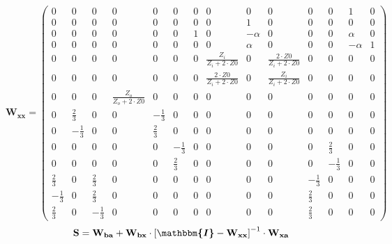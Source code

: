 \[ \mathbf{W_{xx}} = \left(\begin{smallmatrix} 0 & 0 & 0 & 0 & 0 & 0 &
0 & 0 & 0 & 0 & 0 & 0 & 1 & 0 \\ 0 & 0 & 0 & 0 & 0 & 0 & 0 & 0 & 1 & 0
& 0 & 0 & 0 & 0 \\ 0 & 0 & 0 & 0 & 0 & 0 & 1 & 0 & -\alpha & 0 & 0 & 0
& \alpha & 0 \\ 0 & 0 & 0 & 0 & 0 & 0 & 0 & 0 & \alpha & 0 & 0 & 0 &
-\alpha & 1 \\ 0 & 0 & 0 & 0 & 0 & 0 & 0 & \frac{Z_i}{Z_i+2\cdot Z0} &
0 & \frac{2\cdot Z0}{Z_i+2\cdot Z0} & 0 & 0 & 0 & 0 \\ 0 & 0 & 0 & 0 &
0 & 0 & 0 & \frac{2\cdot Z0}{Z_i+2\cdot Z0} & 0 &
\frac{Z_i}{Z_i+2\cdot Z0} & 0 & 0 & 0 & 0 \\ 0 & 0 & 0 &
\frac{Z_o}{Z_o+2\cdot Z0} & 0 & 0 & 0 & 0 & 0 & 0 & 0 & 0 & 0 & 0 \\ 0
& \frac{2}{3} & 0 & 0 & -\frac{1}{3} & 0 & 0 & 0 & 0 & 0 & 0 & 0 & 0 &
0 \\ 0 & -\frac{1}{3} & 0 & 0 & \frac{2}{3} & 0 & 0 & 0 & 0 & 0 & 0 &
0 & 0 & 0 \\ 0 & 0 & 0 & 0 & 0 & -\frac{1}{3} & 0 & 0 & 0 & 0 & 0 &
\frac{2}{3} & 0 & 0 \\ 0 & 0 & 0 & 0 & 0 & \frac{2}{3} & 0 & 0 & 0 & 0
& 0 & -\frac{1}{3} & 0 & 0 \\ \frac{2}{3} & 0 & \frac{2}{3} & 0 & 0 &
0 & 0 & 0 & 0 & 0 & -\frac{1}{3} & 0 & 0 & 0 \\ -\frac{1}{3} & 0 &
\frac{2}{3} & 0 & 0 & 0 & 0 & 0 & 0 & 0 & \frac{2}{3} & 0 & 0 & 0 \\
\frac{2}{3} & 0 & -\frac{1}{3} & 0 & 0 & 0 & 0 & 0 & 0 & 0 &
\frac{2}{3} & 0 & 0 & 0 \end{smallmatrix}\right) \]
\[ \mathbf{S}=\mathbf{W_{ba}}+\mathbf{W_{bx}}\cdot\left[
\boldsymbol{\mathbbm{I}}
-\mathbf{W_{xx}}\right]^{-1}\cdot\mathbf{W_{xa}} \]
